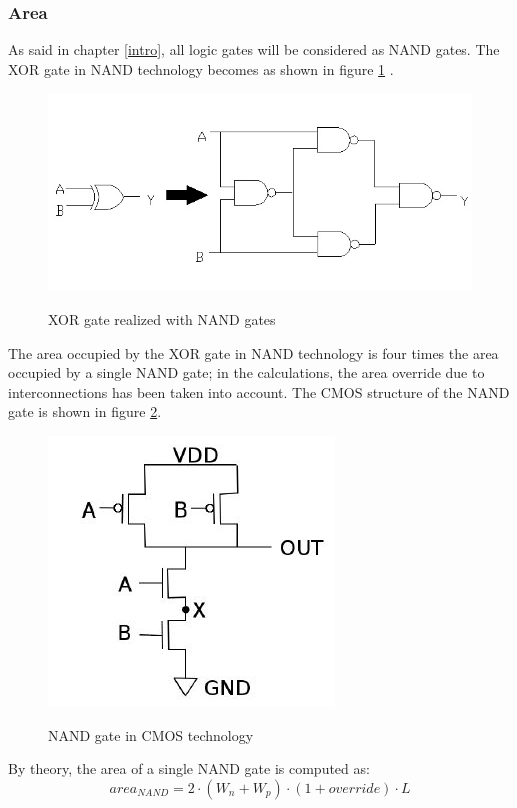 \subsubsection{Area}\label{area_ha}
As said in chapter \ref{intro}, all logic gates will be considered as NAND gates. The XOR gate in NAND technology becomes as shown in figure \ref{xor_to_nand} \cite{rif1}.
\begin{figure}[h]
	\caption{XOR gate realized with NAND gates}
	\includegraphics{img/xor_to_nand.png}
	\centering
	\label{xor_to_nand}
\end{figure}
The area occupied by the XOR gate in NAND technology is four times the area occupied by a single NAND gate; in the calculations, the area override due to interconnections has been taken into account. The CMOS structure of the NAND gate is shown in figure \ref{nand_gate_MOS}.
\begin{figure}
	\caption{NAND gate in CMOS technology}
	\includegraphics{img/nand_gate_transistor.png}
	\centering
	\label{nand_gate_MOS}
\end{figure}
By theory, the area of a single NAND gate is computed as:
\begin{equation}
area_{NAND} = 2\cdot (W_n + W_p)\cdot (1 + override)\cdot L
\end{equation}
